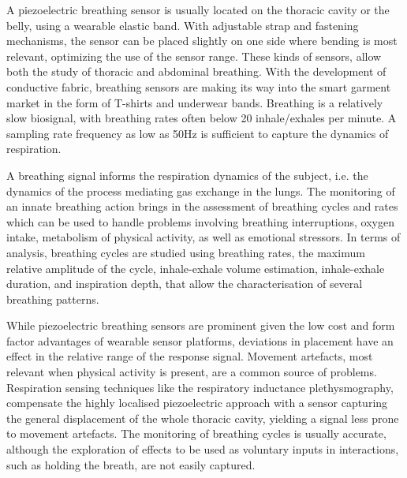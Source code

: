 A piezoelectric breathing sensor is usually located on the thoracic cavity or the belly, using a wearable elastic band. With adjustable strap and fastening mechanisms, the sensor can be placed slightly on one side where bending is most relevant, optimizing the use of the sensor range. These kinds of sensors, allow both the study of thoracic and abdominal breathing. With the development of conductive fabric, breathing sensors are making its way into the smart garment market in the form of T-shirts and underwear bands. Breathing is a relatively slow biosignal, with breathing rates often below 20 inhale/exhales per minute. A sampling rate frequency as low as 50Hz is sufficient to capture the dynamics of respiration.

A breathing signal informs the respiration dynamics of the subject, i.e. the dynamics of the process mediating gas exchange in the lungs. The monitoring of an innate breathing action brings in the assessment of breathing cycles and rates which can be used to handle problems involving breathing interruptions, oxygen intake, metabolism of physical activity, as well as emotional stressors. In terms of analysis, breathing cycles are studied using breathing rates, the maximum relative amplitude of the cycle, inhale-exhale volume estimation, inhale-exhale duration, and inspiration depth, that allow the characterisation of several breathing patterns.

While piezoelectric breathing sensors are prominent given the low cost and form factor advantages of wearable sensor platforms, deviations in placement have an effect in the relative range of the response signal. Movement artefacts, most relevant when physical activity is present, are a common source of problems. Respiration sensing techniques like the respiratory inductance plethysmography, compensate the highly localised piezoelectric approach with a sensor capturing the general displacement of the whole thoracic cavity, yielding a signal less prone to movement artefacts. The monitoring of breathing cycles is usually accurate, although the exploration of effects to be used as voluntary inputs in interactions, such as holding the breath, are not easily captured.

